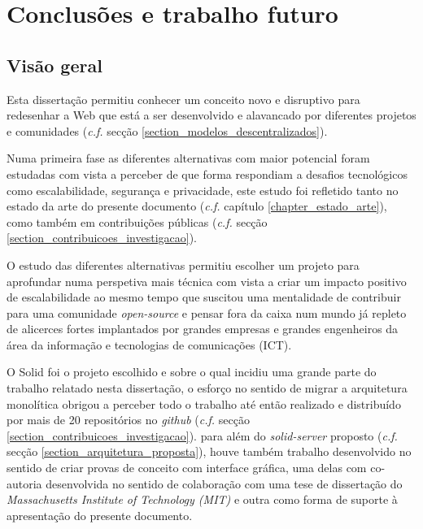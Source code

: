 
\chapter{Conclusões e trabalho futuro}
\label{cap:7}

\section{Visão geral}

Esta dissertação permitiu conhecer um conceito novo e disruptivo para redesenhar a Web que está a ser desenvolvido e alavancado por diferentes projetos e comunidades (\emph{c.f.} secção \ref{section_modelos_descentralizados}).

Numa primeira fase as diferentes alternativas com maior potencial foram estudadas com vista a perceber de que forma respondiam a desafios tecnológicos como escalabilidade, segurança e privacidade, este estudo foi refletido tanto no estado da arte do presente documento (\emph{c.f.} capítulo \ref{chapter_estado_arte}), como também em contribuições públicas (\emph{c.f.} secção \ref{section_contribuicoes_investigacao}).

O estudo das diferentes alternativas permitiu escolher um projeto para aprofundar numa perspetiva mais técnica com vista a criar um impacto positivo de escalabilidade ao mesmo tempo que suscitou uma mentalidade de contribuir para uma comunidade \emph{open-source} e pensar fora da caixa num mundo já repleto de alicerces fortes implantados por grandes empresas e grandes engenheiros da área da informação e tecnologias de comunicações (ICT).

O Solid foi o projeto escolhido e sobre o qual incidiu uma grande parte do trabalho relatado nesta dissertação, o esforço no sentido de migrar a arquitetura monolítica obrigou a perceber todo o trabalho até então realizado e distribuído por mais de 20 repositórios no \emph{github} (\emph{c.f.} secção \ref{section_contribuicoes_investigacao}). para além do \emph{solid-server} proposto (\emph{c.f.} secção \ref{section_arquitetura_proposta}), houve também trabalho desenvolvido no sentido de criar provas de conceito com interface gráfica, uma delas com co-autoria desenvolvida no sentido de colaboração com uma tese de dissertação do \emph{Massachusetts Institute of Technology (MIT\label{sym:MIT})} e outra como forma de suporte à apresentação do presente documento.

